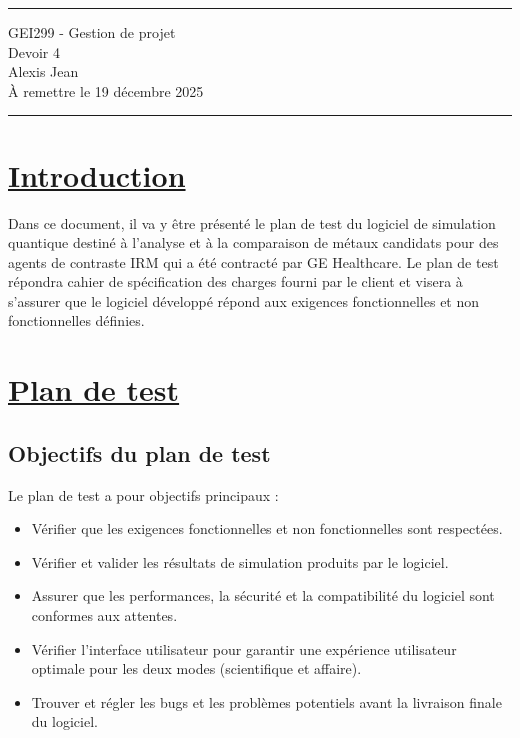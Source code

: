 \documentclass[11pt]{article}
\begin{document}
\hrule

\begin{center}
  {\Large GEI299 - Gestion de projet} \\ \vspace{5mm}
  {\LARGE\sffamily Devoir 4} \\
  Alexis Jean\\
  À remettre le 19 décembre 2025
\end{center}

\hrule

\section{\underline{Introduction}}
Dans ce document, il va y être présenté le plan de test du logiciel de simulation quantique destiné à l’analyse et à la comparaison de métaux candidats pour des agents de contraste IRM qui a été contracté par GE Healthcare. Le plan de test répondra cahier de spécification des charges fourni par le client et visera à s’assurer que le logiciel développé répond aux exigences fonctionnelles et non fonctionnelles définies.

\section{\underline{Plan de test}}
\subsection{Objectifs du plan de test}
Le plan de test a pour objectifs principaux :
\begin{itemize}
  \item Vérifier que les exigences fonctionnelles et non fonctionnelles sont respectées.
  \item Vérifier et valider les résultats de simulation produits par le logiciel.
  \item Assurer que les performances, la sécurité et la compatibilité du logiciel sont conformes aux attentes.  
  \item Vérifier l’interface utilisateur pour garantir une expérience utilisateur optimale pour les deux modes (scientifique et affaire).
  \item Trouver et régler les bugs et les problèmes potentiels avant la livraison finale du logiciel.
\end{itemize}
\end{document}
